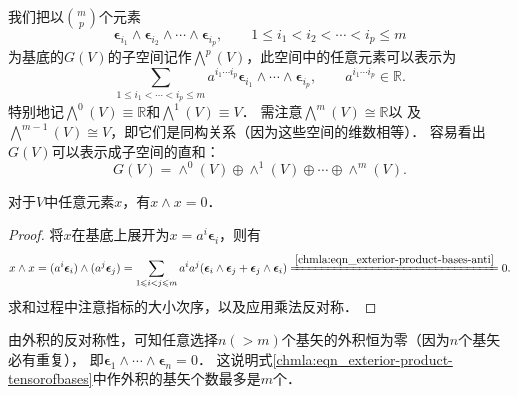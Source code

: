   


我们把以$\binom{m}{p}$个元素
\begin{equation}\label{chmla:eqn_ep00}
     \boldsymbol{\epsilon}_{i_1} \wedge \boldsymbol{\epsilon}_{i_2} \wedge \cdots \wedge \boldsymbol{\epsilon}_{i_p},
     \qquad 1\leqslant {i_1} < {i_2} < \cdots <i_p  \leqslant m
\end{equation}
为基底的$G(V)$的子空间记作$\bigwedge^p(V)$，此空间中的任意元素可以表示为
\begin{equation}\label{chmla:eqn_ep10}
    \sum_{1\leqslant {i_1} < \cdots <i_p  \leqslant m } a^{i_1\cdots i_p}
    \boldsymbol{\epsilon}_{i_1} \wedge \cdots \wedge \boldsymbol{\epsilon}_{i_p},
    \qquad a^{i_1\cdots i_p} \in \mathbb{R} .
\end{equation}
特别地记$\bigwedge^0(V)\equiv\mathbb{R}$和$\bigwedge^1(V)\equiv V$．
需注意$\bigwedge^m(V) \cong \mathbb{R}$以
及$\bigwedge^{m-1}(V) \cong V$，即它们是同构关系（因为这些空间的维数相等）．
容易看出$G(V)$可以表示成子空间的直和：
\begin{equation}
    G(V)= \wedge^0(V) \oplus \wedge^1(V) \oplus \cdots \oplus \wedge^m(V) .
\end{equation}


\begin{proposition}
    对于$V$中任意元素$x$，有$x\wedge x=0$．
\end{proposition}
\begin{proof}
    将$x$在基底上展开为$x=a^i \boldsymbol{\epsilon}_{i}$，则有
    \begin{align*}
        x\wedge x = (a^i \boldsymbol{\epsilon}_{i}) \wedge (a^j \boldsymbol{\epsilon}_{j})
        =\sum_{1\leqslant {i} < j  \leqslant m } a^i a^j
        (\boldsymbol{\epsilon}_{i} \wedge \boldsymbol{\epsilon}_{j}+
        \boldsymbol{\epsilon}_{j} \wedge \boldsymbol{\epsilon}_{i})
        \xlongequal{\ref{chmla:eqn_exterior-product-bases-anti}}0 .
    \end{align*}
    求和过程中注意指标的大小次序，以及应用乘法反对称．
\end{proof}

\begin{remark}
    由外积的反对称性，可知任意选择$n(>m)$个基矢的外积恒为零（因为$n$个基矢必有重复），
    即$\boldsymbol{\epsilon}_{1} \wedge \cdots \wedge \boldsymbol{\epsilon}_{n}=0$．
    这说明式\eqref{chmla:eqn_exterior-product-tensorofbases}中作外积的基矢个数最多是$m$个．
\end{remark}


